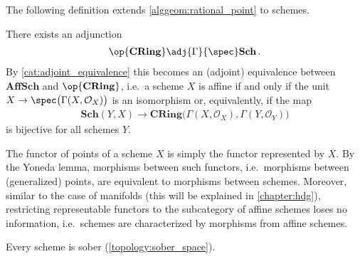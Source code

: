     The following definition extends \cref{alggeom:rational_point} to schemes.

    \begin{property}
        There exists an adjunction
        \begin{gather}
            \op{\mathbf{CRing}}\adj{\Gamma}{\spec}\mathbf{Sch}\,.
        \end{gather}
        By \cref{cat:adjoint_equivalence} this becomes an (adjoint) equivalence between $\mathbf{AffSch}$ and $\op{\mathbf{CRing}}$, i.e.~a scheme $X$ is affine if and only if the unit $X\rightarrow\spec\bigl(\Gamma(X,\mathcal{O}_X)\bigr)$ is an isomorphism or, equivalently, if the map
        \begin{gather}
            \mathbf{Sch}(Y,X)\rightarrow\mathbf{CRing}\bigl(\Gamma(X,\mathcal{O}_X),\Gamma(Y,\mathcal{O}_Y)\bigr)
        \end{gather}
        is bijective for all schemes $Y$.
    \end{property}

    \begin{property}
        The functor of points of a scheme $X$ is simply the functor represented by $X$. By the Yoneda lemma, morphisms between such functors, i.e.~morphisms between (generalized) points, are equivalent to morphisms between schemes. Moreover, similar to the case of manifolds (this will be explained in \cref{chapter:hdg}), restricting representable functors to the subcategory of affine schemes loses no information, i.e.~schemes are characterized by morphisms from affine schemes.
    \end{property}

    \begin{property}[Sober]
        Every scheme is sober (\cref{topology:sober_space}).
    \end{property}

